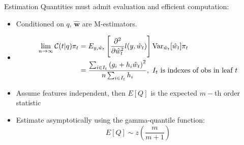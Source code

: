 \begin{frame}{Estimation}
	Quantities must admit evaluation and efficient computation:
	\begin{itemize}
		\item<2-> Conditioned on $q$, $\hat{\mathbf{w}}$ are M-estimators.
		\item<2-> 	\begin{align*}
		\lim_{n\to\infty}
		\mathcal{C}(t|q)\pi_t
		&=
		E_{y,\hat{w}_t} \left[ \frac{\partial^2}{\partial \hat{w}_t^2}l(y,\hat{w}_t)\right]
		\mathrm{Var}_{\hat{w}_t}[\hat{w}_{t}]\pi_t\\
		&= 
		\frac{\sum_{i\in I_t} \left(g_i+h_i\hat{w}_t\right)^2}{n\sum_{i\in I_t}h_i},
		\text{ $I_t$ is indexes of obs in leaf $t$}
		\end{align*}
		\item<3-> Assume features independent, then $E[Q]$ is the expected $m-$th order statistic
		\item<3-> Estimate asymptotically using the gamma-quantile function: $$E[Q]\sim z\left(\frac{m}{m+1}\right)$$
	\end{itemize}
\end{frame}

